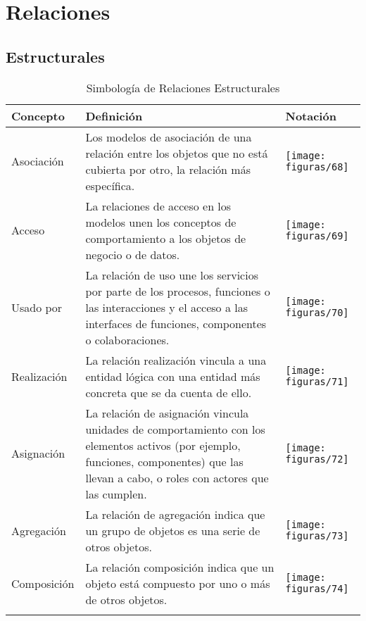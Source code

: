 \section{Relaciones}
  \subsection{Estructurales}
    \begin{longtable}
    	{m{3cm}m{4.8cm}m{5.2cm}}
    	\hline
    	\rowcolor[HTML]{0073a1}
    	{\color[HTML]{FFFFFF} \textbf{Concepto}} & {\color[HTML]{FFFFFF} \textbf{Definición}} & {\color[HTML]{FFFFFF} \textbf{Notación}} \\
    	\hline
    	Asociación & Los modelos de asociación de una relación entre los objetos que no está cubierta por otro, la relación más específica. & \texttt{[image: figuras/68]} \\ \hline
    	Acceso & La relaciones de acceso en los modelos unen los conceptos de comportamiento a los objetos de negocio o de datos. & \texttt{[image: figuras/69]} \\ \hline
    	Usado por & La relación de uso une los servicios por parte de los procesos, funciones o las interacciones y el acceso a las interfaces de funciones, componentes o colaboraciones. & \texttt{[image: figuras/70]} \\ \hline
    	Realización & La relación realización vincula a una entidad lógica con una entidad más concreta que se da cuenta de ello. & \texttt{[image: figuras/71]} \\ \hline
    	Asignación\index{Asignación} & La relación de asignación vincula unidades de comportamiento con los elementos activos (por ejemplo, funciones, componentes) que las llevan a cabo, o roles con actores que las cumplen. & \texttt{[image: figuras/72]} \\ \hline
    	Agregación & La relación de agregación indica que un grupo de objetos es una serie de otros objetos. & \texttt{[image: figuras/73]} \\ \hline
    	Composición\index{Composición} & La relación composición indica que un objeto está compuesto por uno o más de otros objetos. & \texttt{[image: figuras/74]} \\
  	    \bottomrule
    	\captionsetup{width=.95\textwidth}
    	\caption{Simbología\index{Simbología} de Relaciones Estructura\index{Estructura}les \cite{ref9}}
    	\label{tabla32}
    \end{longtable}
    
